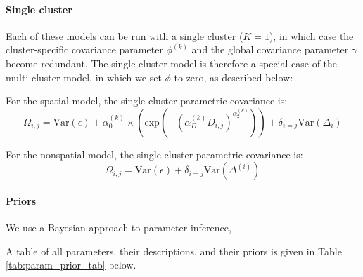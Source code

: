 \documentclass[12pt]{article}
\begin{document}
\paragraph{Single cluster}
Each of these models can be run with a single cluster ($K=1$), 
in which case the cluster-specific covariance parameter $\phi^{(k)}$ 
and the global covariance parameter $\gamma$ become redundant.
The single-cluster model is therefore a special case of the multi-cluster model, 
in which we set $\phi$ to zero, as described below:

For the spatial model, the single-cluster parametric covariance is:
\begin{equation}
\Omega_{i,j} = \text{Var}(\epsilon) + 
\alpha^{(k)}_0 \times \left(\text{exp} \left(  -(\alpha^{(k)}_D D_{i,j})^{\alpha^{(k)}_2}\right) \right)	 +
\delta_{i=j} \text{Var}(\Delta_i)
\label{admixed_spatial_cov}
\end{equation}

For the nonspatial model, the single-cluster parametric covariance is:
\begin{equation}
\Omega_{i,j} = \text{Var}(\epsilon) + \delta_{i=j} \text{Var}(\Delta^{(i)})
\label{admixed_discrete_covariance}
\end{equation}

\paragraph{Priors}
We use a Bayesian approach to parameter inference, 

A table of all parameters, their descriptions, and their priors is given in Table \ref{tab:param_prior_tab} below.
\end{document}
